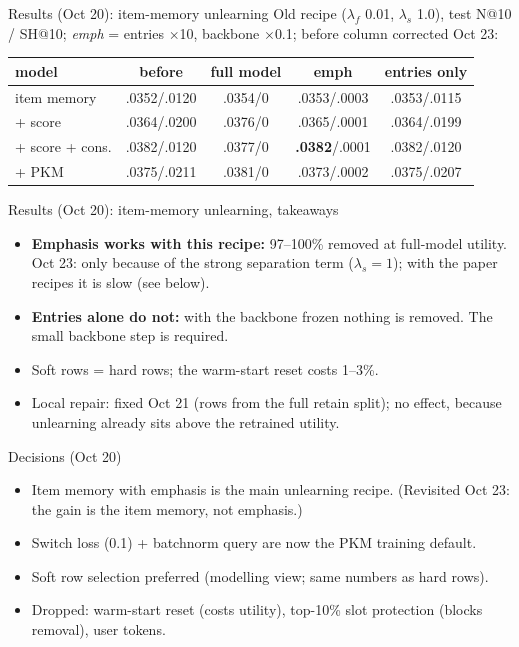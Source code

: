 \documentclass{beamer}
\begin{document}
\begin{frame}{Results (Oct 20): item-memory unlearning}
Old recipe ($\lambda_f$ 0.01, $\lambda_s$ 1.0), test N@10 / SH@10; \emph{emph} =
entries $\times$10, backbone $\times$0.1; before column \alert{corrected Oct 23}:
\begin{center}
\footnotesize\setlength{\tabcolsep}{3pt}
\begin{tabular}{|l|c|c|c|c|}
\hline
model & before & full model & emph & entries only \\
\hline
item memory           & .0352/.0120 & .0354/0 & .0353/.0003 & .0353/.0115 \\
\quad + score        & .0364/.0200 & .0376/0 & .0365/.0001 & .0364/.0199 \\
\quad + score + cons. & .0382/.0120 & .0377/0 & \textbf{.0382}/.0001 & .0382/.0120 \\
\quad + PKM          & .0375/.0211 & .0381/0 & .0373/.0002 & .0375/.0207 \\
\hline
\end{tabular}
\end{center}
\end{frame}

\begin{frame}{Results (Oct 20): item-memory unlearning, takeaways}
\begin{itemize}
  \item \textbf{Emphasis works with this recipe:} 97--100\% removed at
        full-model utility. \alert{Oct 23: only because of the strong separation
        term ($\lambda_s = 1$); with the paper recipes it is slow (see below).}
  \item \textbf{Entries alone do not:} with the backbone frozen nothing is
        removed. The small backbone step is required.
  \item Soft rows = hard rows; the warm-start reset costs 1--3\%.
  \item Local repair: fixed Oct 21 (rows from the full retain split); no
        effect, because unlearning already sits above the retrained utility.
\end{itemize}
\end{frame}

\begin{frame}{Decisions (Oct 20)}
\begin{itemize}
  \item Item memory with emphasis is the main unlearning recipe.
        \alert{(Revisited Oct 23: the gain is the item memory, not emphasis.)}
  \item Switch loss (0.1) + batchnorm query are now the PKM training default.
  \item Soft row selection preferred (modelling view; same numbers as hard rows).
  \item Dropped: warm-start reset (costs utility), top-10\% slot protection
        (blocks removal), user tokens.
\end{itemize}
\end{frame}
\end{document}
